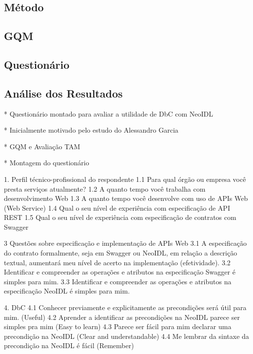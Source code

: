 \subsection{Método}
\vspace{-6mm}

\subsection{GQM}
\vspace{-6mm}

\subsection{Questionário}
\vspace{-6mm}

\subsection{Análise dos Resultados}
\vspace{-6mm}


* Questionário montado para avaliar a utilidade de DbC com NeoIDL

* Inicialmente motivado pelo estudo do Alessandro Garcia

* GQM e Avaliação TAM

* Montagem do questionário

1. Perfil técnico-profissional do respondente
1.1 Para qual órgão ou empresa você presta serviços atualmente?
1.2 A quanto tempo você trabalha com desenvolvimento Web
1.3 A quanto tempo você desenvolve com uso de APIs Web (Web Service)
1.4 Qual o seu nível de experiência com especificação de API REST
1.5 Qual o seu nível de experiência com especificação de contratos com Swagger

3 Questões sobre especificação e implementação de APIs Web
3.1 A especificação do contrato formalmente, seja em Swagger ou NeoIDL, em
relação a descrição textual, aumentará meu nível de acerto na implementação (efetividade).
3.2 Identificar e compreender as operações e atributos na especificação Swagger
é simples para mim.
3.3 Identificar e compreender as operações e atributos na especificação NeoIDL é
simples para mim.

4. DbC
4.1 Conhecer previamente e explicitamente as precondições será útil para mim.
(Useful)
4.2 Aprender a identificar as precondições na NeoIDL parece ser simples pra mim
(Easy to learn)
4.3 Parece ser fácil para mim declarar uma precondição na NeoIDL
(Clear and understandable)
4.4 Me lembrar da sintaxe da precondição na NeoIDL é fácil  (Remember)

